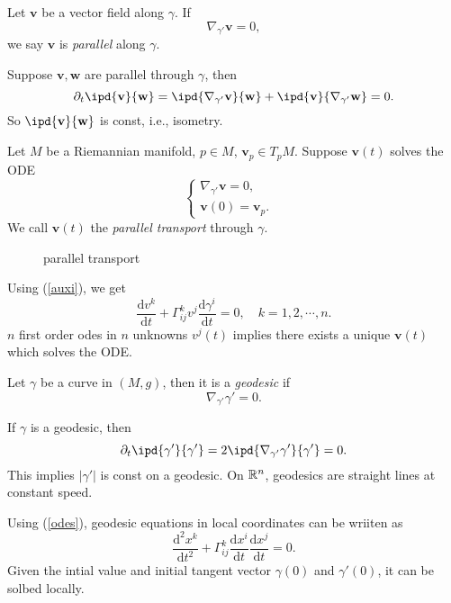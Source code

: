 \begin{definition}
  Let $\mathbf{v}$ be a vector field along $\gamma$. If 
  \[
  \nabla _{\gamma'}\mathbf{v}=0,
  \] 
  we say $\mathbf{v}$ is \textit{parallel} along $\gamma$.
\end{definition}
Suppose $\mathbf{v},\mathbf{w}$ are parallel through $\gamma$, then
\[
\partial_t \ipd{\mathbf{v}}{\mathbf{w}}=\ipd{\nabla _{\gamma'}\mathbf{v}}{\mathbf{w}}+\ipd{\mathbf{v}}{\nabla _{\gamma'}\mathbf{w}}=0.
\] 
So $\ipd{\mathbf{v}}{\mathbf{w}}$ is const, i.e., isometry.
\begin{definition}
  Let $M$ be a Riemannian manifold, $p\in M$, $\mathbf{v}_p\in T_pM$. Suppose $\mathbf{v}(t)$ solves the ODE
  \[
  \begin{cases}
    \nabla _{\gamma'}\mathbf{v}=0,&\\
    \mathbf{v}(0)=\mathbf{v}_p.&
  \end{cases}
  \] 
  We call $\mathbf{v}(t)$ the \textit{parallel transport}  through $\gamma$.
\end{definition}
\begin{figure}[ht]
    \centering
    \caption{parallel transport}
    \label{fig:parallel-transport}
\end{figure}
Using (\ref{auxi}), we get
\begin{equation}
  \frac{\mathrm{d}v^k}{\mathrm{d}t}+\Gamma^k_{ij}v^j \frac{\mathrm{d}\gamma^i}{\mathrm{d}t}=0,\quad k=1,2,\cdots ,n.\label{odes}
\end{equation}
$n$ first order odes in $n$ unknowns $v^j(t)$ implies there exists a unique $\mathbf{v}(t)$ which solves the ODE.
\begin{definition}
  Let $\gamma$ be a curve in $(M,g)$, then it is a  \textit{geodesic} if 
  \begin{equation}
    \nabla _{\gamma'}\gamma'=0.
  \end{equation}
\end{definition}
If $\gamma$ is a geodesic, then
\[
\partial_t \ipd{\gamma'}{\gamma'}=2\ipd{\nabla_{\gamma'} \gamma'}{\gamma'}=0.
\] 
This implies $|\gamma'|$ is const on a geodesic. On $\mathbb{R}^n$, geodesics are straight lines at constant speed.

Using (\ref{odes}), geodesic equations in local coordinates can be wriiten as
\begin{equation}
  \frac{\mathrm{d}^2x^k}{\mathrm{d}t^2}+ \Gamma_{ij}^k \frac{\mathrm{d}x^i}{\mathrm{d}t} \frac{\mathrm{d}x^j}{\mathrm{d}t}=0.
\end{equation}
Given the intial value and initial tangent vector $\gamma(0)$ and $\gamma'(0)$, it can be solbed locally.

